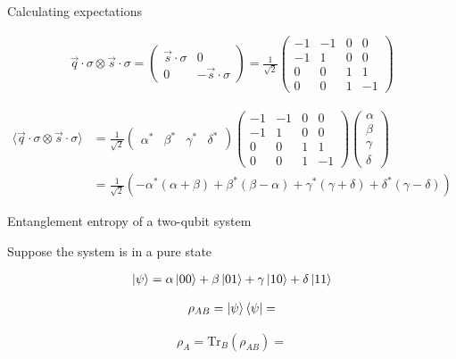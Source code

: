 \documentclass[aspectratio=1610]{beamer}					%
\begin{document}
\begin{frame}{Calculating expectations}


\begin{align*}
\vec{q}\cdot\sigma\otimes\vec{s}\cdot\sigma = 
\begin{pmatrix}
\vec{s}\cdot\sigma & 0 \\
0 & -\vec{s}\cdot\sigma
\end{pmatrix} = 
\frac{1}{\sqrt{2}}\begin{pmatrix}
-1 & -1 & 0 & 0\\
-1 & 1 & 0 & 0\\
0 & 0 & 1 & 1 \\
0 & 0 & 1 & -1
\end{pmatrix}
\end{align*}

\begin{align*}
\langle \vec{q}\cdot\sigma\otimes\vec{s}\cdot\sigma\rangle &= 
\frac{1}{\sqrt{2}}
\begin{pmatrix}
\alpha^{*} &
\beta^{*}&
\gamma^{*}&
\delta^{*}
\end{pmatrix}\begin{pmatrix}
-1 & -1 & 0 & 0\\
-1 & 1 & 0 & 0\\
0 & 0 & 1 & 1 \\
0 & 0 & 1 & -1
\end{pmatrix}
\begin{pmatrix}
\alpha\\
\beta\\
\gamma\\
\delta
\end{pmatrix}\\
&= \frac{1}{\sqrt{2}}\left(-\alpha^{*}(\alpha+\beta) + \beta^{*}(\beta-\alpha) + \gamma^{*}(\gamma+\delta) + \delta^{*}(\gamma-\delta)\right)
\end{align*}


\end{frame}

\begin{frame}{Entanglement entropy of a two-qubit system}

Suppose the system is in a pure state

\begin{align*}
\ket{\psi} = \alpha\ket{00} + \beta\ket{01} + \gamma\ket{10} + \delta\ket{11}
\end{align*}

\begin{align*}
\rho_{AB} = \ket{\psi}\bra{\psi} = 
\end{align*}


\begin{align*}
\rho_{A} = \mathrm{Tr}_{B}(\rho_{AB}) = 
\end{align*}

\end{frame}
\end{document}
